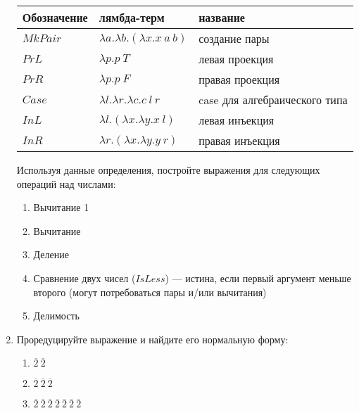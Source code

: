 \documentclass[10pt,a4paper,oneside]{article}
\begin{document}
\begin{enumerate}
\begin{center}\begin{tabular}{lll}
Обозначение & лямбда-терм & название\\\hline
$MkPair$ & $\lambda a.\lambda b.(\lambda x.x\ a\ b)$ & создание пары\\
$PrL$ & $\lambda p.p\ T$ & левая проекция\\
$PrR$ & $\lambda p.p\ F$ & правая проекция\\\hline
$Case$ & $\lambda l.\lambda r.\lambda c.c\ l\ r$ & case для алгебраического типа\\
$InL$ & $\lambda l.(\lambda x.\lambda y.x\ l)$ & левая инъекция\\
$InR$ & $\lambda r.(\lambda x.\lambda y.y\ r)$ & правая инъекция\\
\end{tabular}\end{center}

Используя данные определения, постройте выражения для следующих операций над числами:

\begin{enumerate}
\item Вычитание 1
\item Вычитание
\item Деление
\item Сравнение двух чисел ($IsLess$) — истина, если первый аргумент меньше второго
(могут потребоваться пары и/или вычитания)
\item Делимость
\end{enumerate}

\item Проредуцируйте выражение и найдите его нормальную форму: 
\begin{enumerate}
\item $\overline{2}\ \overline{2}$
\item $\overline{2}\ \overline{2}\ \overline{2}$
\item $\overline{2}\ \overline{2}\ \overline{2}\ \overline{2}\ \overline{2}\ \overline{2}\ \overline{2}$
\end{enumerate}


\end{enumerate}
\end{document}
